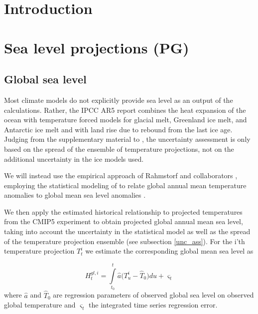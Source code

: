 \documentclass[wrr, draft]{agutex}
\begin{document}
\begin{article}



\section{Introduction}\label{sec:intro}

\section{Sea level projections {\color{blue} (PG)}}



\subsection{Global sea level}
Most climate models do not explicitly provide sea level as an output of the calculations. Rather, the IPCC AR5 report \citep[ch.~13]{ipcc} combines the heat expansion of the ocean with temperature forced models for glacial melt, Greenland ice melt, and Antarctic ice melt and with land rise due to rebound from the last ice age. Judging from the supplementary material to \citet[ch.~13]{ipcc}, the uncertainty assessment is only based on the spread of the ensemble of temperature projections, not on the additional uncertainty in the ice models used.

We will instead use the empirical approach of Rahmstorf and collaborators \citep{Rahmstorf07,Rahmstorf11}, employing the statistical modeling of \citet{Bolin2014a} to relate global annual mean temperature anomalies \citep{giss} to global mean sea level anomalies \citep{csiro}. 


We then apply the estimated historical relationship to projected temperatures from the CMIP5 experiment \citep{cmip5} to obtain projected global annual mean sea level, taking into account the uncertainty in the statistical model as well as the spread of the temperature projection ensemble (see subsection \ref{unc_ass}). 
For the i'th temperature projection $T_t^i$ we estimate the corresponding global mean sea level as

\[H_t^{gl,i} = \int\limits_{{t_0}}^t {{\hat a} (T_u^i - {{\hat T}_0}} )du + {\varsigma _t}\]
where ${\hat a}$ and ${\hat T}_0$ are regression parameters of observed global sea level on observed global temperature and $\varsigma_t$ the integrated time series regression error.




\end{article}
\end{document}
